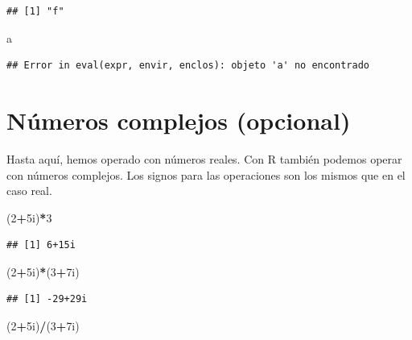 \documentclass[]{book}
\newenvironment{Shaded}{\begin{snugshade}}{\end{snugshade}}
\newcommand{\DecValTok}[1]{\textcolor[rgb]{0.00,0.00,0.81}{#1}}
\newcommand{\NormalTok}[1]{#1}
\newcommand{\OperatorTok}[1]{\textcolor[rgb]{0.81,0.36,0.00}{\textbf{#1}}}
\theoremstyle{definition}
\theoremstyle{definition}
\theoremstyle{definition}
\theoremstyle{remark}
\begin{document}
\begin{verbatim}
## [1] "f"
\end{verbatim}

\begin{Shaded}
\begin{Highlighting}[]
\NormalTok{a}
\end{Highlighting}
\end{Shaded}

\begin{verbatim}
## Error in eval(expr, envir, enclos): objeto 'a' no encontrado
\end{verbatim}

\hypertarget{numeros-complejos-opcional}{%
\section{Números complejos (opcional)}\label{numeros-complejos-opcional}}

Hasta aquí, hemos operado con números reales. Con R también podemos operar con números complejos. Los signos para las operaciones son los mismos que en el caso real.

\begin{Shaded}
\begin{Highlighting}[]
\NormalTok{(}\DecValTok{2}\OperatorTok{+}\NormalTok{5i)}\OperatorTok{*}\DecValTok{3}
\end{Highlighting}
\end{Shaded}

\begin{verbatim}
## [1] 6+15i
\end{verbatim}

\begin{Shaded}
\begin{Highlighting}[]
\NormalTok{(}\DecValTok{2}\OperatorTok{+}\NormalTok{5i)}\OperatorTok{*}\NormalTok{(}\DecValTok{3}\OperatorTok{+}\NormalTok{7i)}
\end{Highlighting}
\end{Shaded}

\begin{verbatim}
## [1] -29+29i
\end{verbatim}

\begin{Shaded}
\begin{Highlighting}[]
\NormalTok{(}\DecValTok{2}\OperatorTok{+}\NormalTok{5i)}\OperatorTok{/}\NormalTok{(}\DecValTok{3}\OperatorTok{+}\NormalTok{7i)}
\end{Highlighting}
\end{Shaded}
\end{document}
